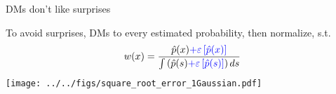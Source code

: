 \begin{frame}{DMs don't like surprises}

To avoid surprises, DMs  to every estimated probability, then normalize, s.t.
\begin{equation}
	w(x)=\frac{\hat{p}(x)\textcolor{blue}{+\varepsilon\left[\hat{p}(x)\right]}}{\int \left(\hat{p}(s) \textcolor{blue}{+\varepsilon\left[\hat{p}(s)\right]} \right)ds}
\end{equation}
\pause
\centering
	\texttt{[image: ../../figs/square\_root\_error\_1Gaussian.pdf]} \\
\end{frame}


%
%
%
%
%

